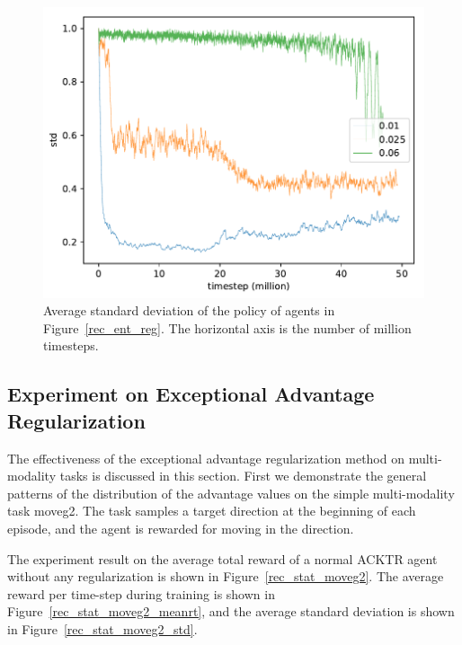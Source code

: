 \begin{figure}[!htbp]
	\includegraphics[width=\textwidth]{images/rec_180609_std_ent_reg.pdf}
	\centering
	\caption{Average standard deviation of the policy of agents in Figure~\ref{rec_ent_reg}. The horizontal axis is the number of million timesteps.}\label{rec_std_ent_reg}
\end{figure}

\subsection{Experiment on Exceptional Advantage Regularization}\label{sec_exp_adv_reg}
The effectiveness of the exceptional advantage regularization method on multi-modality tasks is discussed in this section.
First we demonstrate the general patterns of the distribution of the advantage values on the simple multi-modality task moveg2. The task samples a target direction at the beginning of each episode, and the agent is rewarded for moving in the direction.

The experiment result on the average total reward of a normal ACKTR agent without any regularization is shown in Figure~\ref{rec_stat_moveg2}. The average reward per time-step during training is shown in Figure~\ref{rec_stat_moveg2_meanrt}, and the average standard deviation is shown in Figure~\ref{rec_stat_moveg2_std}.


